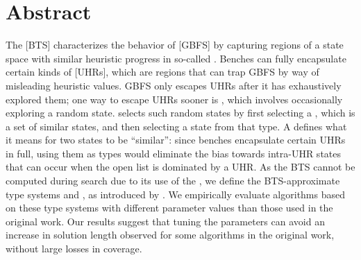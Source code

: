\chapter*{Abstract}

The [BTS] characterizes the behavior of [GBFS] by capturing regions of a state space with similar heuristic progress in so-called . Benches can fully encapsulate certain kinds of [UHRs], which are regions that can trap GBFS by way of misleading heuristic values. GBFS only escapes UHRs after it has exhaustively explored them; one way to escape UHRs sooner is , which involves occasionally exploring a random state.  selects such random states by first selecting a , which is a set of similar states, and then selecting a state from that type. A  defines what it means for two states to be ``similar'': since benches encapsulate certain UHRs in full, using them as types would eliminate the bias towards intra-UHR states that can occur when the open list is dominated by a UHR. As the BTS cannot be computed during search due to its use of the , we define the BTS-approximate type systems  and , as introduced by . We empirically evaluate algorithms based on these type systems with different parameter values than those used in the original work. Our results suggest that tuning the parameters can avoid an increase in solution length observed for some algorithms in the original work, without large losses in coverage.
